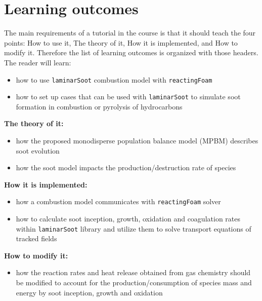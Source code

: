 \chapter*{Learning outcomes}

The main requirements of a tutorial in the course is that it should teach the four points: How to use it, The theory of it, How it is implemented, and How to modify it. Therefore the list of learning outcomes is organized with those headers.\\[0.4cm]

\noindent The reader will learn:\\[0.4cm]


\begin{itemize}
    \item how to use \verb|laminarSoot| combustion model with \verb|reactingFoam|
    \item how to set up cases that can be used with \verb|laminarSoot| to simulate soot formation in combustion or pyrolysis of hydrocarbons 
\end{itemize}
{\bf The theory of it:}
\begin{itemize}
\item how the proposed monodisperse population balance model (MPBM) describes soot evolution
\item how the soot model impacts the production/destruction rate of species 
\end{itemize}
{\bf How it is implemented:}
\begin{itemize}
\item how a combustion model communicates with \verb|reactingFoam| solver 
\item how to calculate soot inception, growth, oxidation and coagulation rates within \verb|laminarSoot| library and utilize them to solve transport equations of tracked fields
\end{itemize}
{\bf How to modify it:}    
\begin{itemize}
\item how the reaction rates and heat release obtained from gas chemistry should be modified to account for the production/consumption of species mass and energy by soot inception, growth and oxidation
\end{itemize}